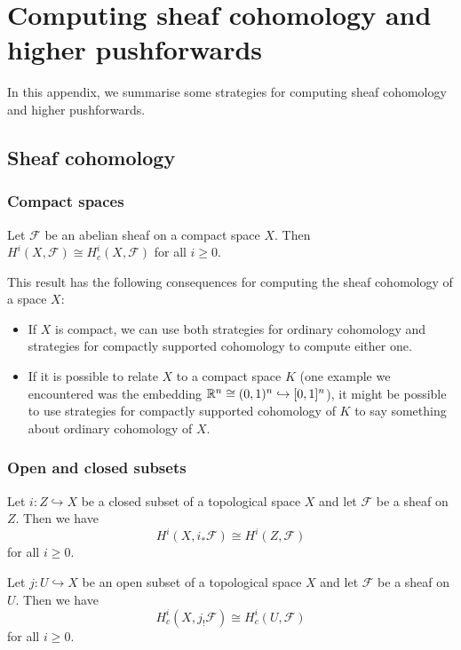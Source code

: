 \chapter{Computing sheaf cohomology and higher pushforwards}

In this appendix, we summarise some strategies for computing sheaf cohomology and higher pushforwards.

\section{Sheaf cohomology}

\subsection{Compact spaces}
\begin{lem}[name={\cref{lem:compactly-supported-cohomology-is-ordinary-cohomology-on-compact-space}}]
Let \(\mathcal F\) be an abelian sheaf on a compact space \(X\).
Then \(H^i(X,\mathcal F)\cong H^i_c(X,\mathcal F)\) for all \(i\geq 0\).
\end{lem}

This result has the following consequences for computing the sheaf cohomology of a space \(X\):
\begin{itemize}
\item If \(X\) is compact, we can use both strategies for ordinary cohomology and strategies for compactly supported cohomology to compute either one.
\item If it is possible to relate \(X\) to a compact space \(K\) (one example we encountered was the embedding \(\mathbb{R}^n\cong(0,1)^n\hookrightarrow [0,1]^n\)), it might be possible to use strategies for compactly supported cohomology of \(K\) to say something about ordinary cohomology of \(X\).
\end{itemize}

\subsection{Open and closed subsets}
\begin{lem}
Let \(i\colon Z\hookrightarrow X\) be a closed subset of a topological space \(X\) and let \(\mathcal F\) be a sheaf on \(Z\).
Then we have
\[ H^i(X,i_*\mathcal F) \cong H^i(Z,\mathcal F) \]
for all \(i\geq 0\).
\end{lem}

\begin{lem}[name={Additional exercise~13.1(d)}]
Let \(j\colon U\hookrightarrow X\) be an open subset of a topological space \(X\) and let \(\mathcal F\) be a sheaf on \(U\).
Then we have
\[ H^i_c(X,j_!\mathcal F) \cong H^i_c(U,\mathcal F) \]
for all \(i\geq 0\).
\end{lem}

